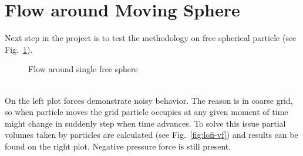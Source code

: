 \section{Flow around Moving Sphere}
Next step in the project is to test the methodology on free spherical particle (see Fig.~\ref{fig:lofi_single_vf}).
\begin{figure}[h!]
\begin{minipage}{0.5\linewidth}
\end{minipage}
\begin{minipage}{0.5\linewidth}
\end{minipage}
\caption{Flow around single free sphere} \label{fig:lofi_single_vf}
\end{figure}\\
On the left plot forces demonstrate noisy behavior. The reason is in coarse grid, so when particle moves the grid particle occupies at any given moment of time might change in suddenly step when time advances. To solve this issue partial volumes taken by particles are calculated (see Fig.~\ref{fig:lofi-vf}) and results can be found on the right plot. Negative pressure force is still present.
